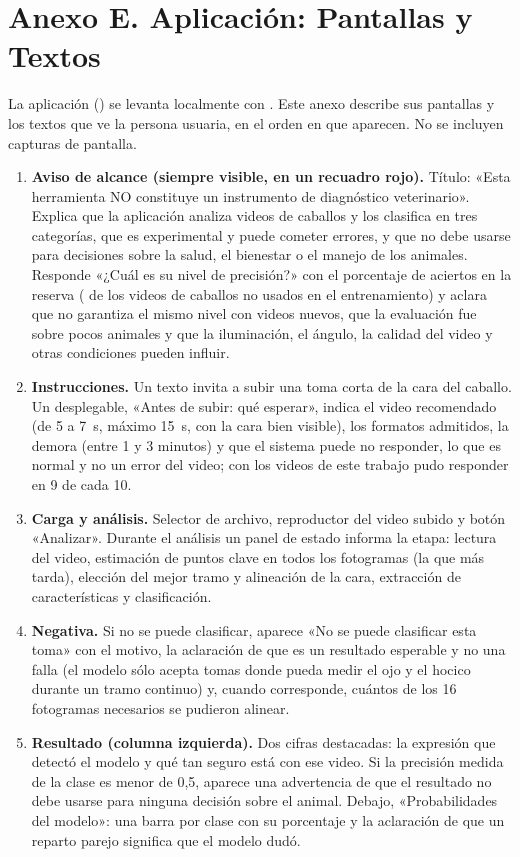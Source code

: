 \section{Anexo E. Aplicación: Pantallas y Textos}
La aplicación () se levanta localmente con . Este anexo describe sus pantallas y los textos que ve la persona usuaria, en el orden en que aparecen. No se incluyen capturas de pantalla.

\begin{enumerate}
  \item \textbf{Aviso de alcance (siempre visible, en un recuadro rojo).} Título: «Esta herramienta NO constituye un instrumento de diagnóstico veterinario». Explica que la aplicación analiza videos de caballos y los clasifica en tres categorías, que es experimental y puede cometer errores, y que no debe usarse para decisiones sobre la salud, el bienestar o el manejo de los animales. Responde «¿Cuál es su nivel de precisión?» con el porcentaje de aciertos en la reserva (\FusionReservaAcc{} de los videos de \CaballosReserva{} caballos no usados en el entrenamiento) y aclara que no garantiza el mismo nivel con videos nuevos, que la evaluación fue sobre pocos animales y que la iluminación, el ángulo, la calidad del video y otras condiciones pueden influir.
  \item \textbf{Instrucciones.} Un texto invita a subir una toma corta de la cara del caballo. Un desplegable, «Antes de subir: qué esperar», indica el video recomendado (de 5 a 7~s, máximo 15~s, con la cara bien visible), los formatos admitidos, la demora (entre 1 y 3 minutos) y que el sistema puede no responder, lo que es normal y no un error del video; con los videos de este trabajo pudo responder en 9 de cada 10.
  \item \textbf{Carga y análisis.} Selector de archivo, reproductor del video subido y botón «Analizar». Durante el análisis un panel de estado informa la etapa: lectura del video, estimación de puntos clave en todos los fotogramas (la que más tarda), elección del mejor tramo y alineación de la cara, extracción de características y clasificación.
  \item \textbf{Negativa.} Si no se puede clasificar, aparece «No se puede clasificar esta toma» con el motivo, la aclaración de que es un resultado esperable y no una falla (el modelo sólo acepta tomas donde pueda medir el ojo y el hocico durante un tramo continuo) y, cuando corresponde, cuántos de los 16 fotogramas necesarios se pudieron alinear.
  \item \textbf{Resultado (columna izquierda).} Dos cifras destacadas: la expresión que detectó el modelo y qué tan seguro está con ese video. Si la precisión medida de la clase es menor de 0,5, aparece una advertencia de que el resultado no debe usarse para ninguna decisión sobre el animal. Debajo, «Probabilidades del modelo»: una barra por clase con su porcentaje y la aclaración de que un reparto parejo significa que el modelo dudó.

\end{enumerate}
